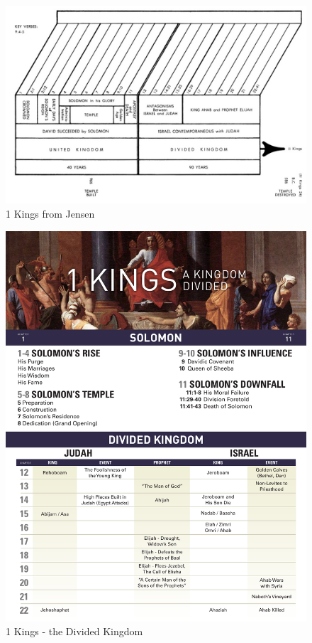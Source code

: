 \newpage
\begin{figure}
\begin{center}
\includegraphics[scale=2, angle=90]{11OT-1Kings/References/Jensen1Kings}
\caption[1 Kings from Jensen]{1 Kings from Jensen}
\label{fig:1 Kings from Jensen}
\end{center}
\end{figure}

\newpage
\begin{figure}
\begin{center}
\includegraphics[scale=0.55, angle=0]{11OT-1Kings/References/1kings-chart}
\caption[1 Kings - the Divided Kingdom]{1 Kings - the Divided Kingdom}
\label{fig:1 Kings - the Divided Kingdom}
\end{center}
\end{figure}


